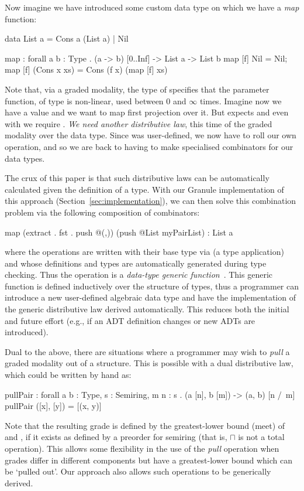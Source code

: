 Now imagine we have introduced some custom data type 
on which we have a \emph{map} function:
%
\begin{granule}
data List a = Cons a (List a) | Nil

map : forall {a b : Type} . (a -> b) [0..Inf] -> List a -> List b
map [f] Nil = Nil;
map [f] (Cons x xs) = Cons (f x) (map [f] xs)
\end{granule}
%
Note that, via a graded modality, the type of  specifies that the parameter
function, of type  is non-linear, used between
$0$ and $\infty$ times. Imagine now we have a value
 and we want to map first
projection over it. But  expects 
and even with  we require .
\emph{We need another distributive law}, this time of the graded modality
over the  data type. Since  was
user-defined, we now have to roll our own  operation, and so we
are back to having to make specialised combinators for our
data types.

The crux of this paper is that such distributive laws can be
automatically calculated given the definition of a type. With
our Granule implementation of this approach (Section~\ref{sec:implementation}),
we can then solve this combination problem via the following
composition of combinators:
%
\begin{granule}
map (extract . fst . push @(,)) (push @List myPairList) : List a
\end{granule}
%
where the  operations are written with their base type
via  (a type application) and whose definitions and types
are automatically generated during type checking. Thus the
 operation is a \textit{data-type generic
  function}~\cite{hinze2000new}. This generic function is defined
inductively over the structure of types, thus a programmer can introduce a new
user-defined algebraic data type and have the implementation of the generic
distributive law derived automatically.
This reduces both the
initial and future effort (e.g., if an ADT definition changes or new ADTs are
introduced).

Dual to the above, there are situations where a programmer
may wish to \emph{pull} a graded modality out of a structure. This is
possible with a dual distributive law, which could be written
by hand as:
%
\begin{granule}
pullPair : forall {a b : Type, s : Semiring, m n : s} . (a [n], b [m]) -> (a, b) [n /\ m]
pullPair ([x], [y]) = [(x, y)]
\end{granule}
%
Note that the resulting grade is defined by the greatest-lower bound
(meet) of  and , if it exists as defined
by a preorder for semiring 
 (that is, $\sqcap$ is not a total operation). This
allows some flexibility in the use of the \emph{pull} operation when
grades differ in different components but have a
greatest-lower bound which can be `pulled out'.
Our approach also allows such operations to be generically derived.


